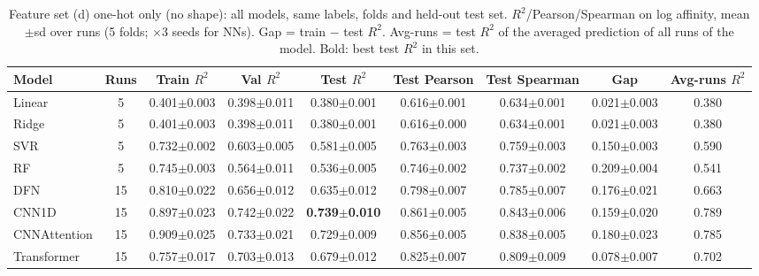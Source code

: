 \begin{table}[H]\centering\scriptsize\setlength{\tabcolsep}{3pt}
\caption{Feature set (d) one-hot only (no shape): all models, same labels, folds and held-out test set. $R^2$/Pearson/Spearman on log affinity, mean$\pm$sd over runs (5 folds; $\times$3 seeds for NNs). Gap = train $-$ test $R^2$. Avg-runs = test $R^2$ of the averaged prediction of all runs of the model. Bold: best test $R^2$ in this set.}
\begin{tabular}{lcccccccc}\toprule
Model & Runs & Train $R^2$ & Val $R^2$ & Test $R^2$ & Test Pearson & Test Spearman & Gap & Avg-runs $R^2$\\\midrule
Linear & 5 & 0.401$\pm$0.003 & 0.398$\pm$0.011 & 0.380$\pm$0.001 & 0.616$\pm$0.001 & 0.634$\pm$0.001 & 0.021$\pm$0.003 & 0.380 \\
Ridge & 5 & 0.401$\pm$0.003 & 0.398$\pm$0.011 & 0.380$\pm$0.001 & 0.616$\pm$0.000 & 0.634$\pm$0.001 & 0.021$\pm$0.003 & 0.380 \\
SVR & 5 & 0.732$\pm$0.002 & 0.603$\pm$0.005 & 0.581$\pm$0.005 & 0.763$\pm$0.003 & 0.759$\pm$0.003 & 0.150$\pm$0.003 & 0.590 \\
RF & 5 & 0.745$\pm$0.003 & 0.564$\pm$0.011 & 0.536$\pm$0.005 & 0.746$\pm$0.002 & 0.737$\pm$0.002 & 0.209$\pm$0.004 & 0.541 \\
DFN & 15 & 0.810$\pm$0.022 & 0.656$\pm$0.012 & 0.635$\pm$0.012 & 0.798$\pm$0.007 & 0.785$\pm$0.007 & 0.176$\pm$0.021 & 0.663 \\
CNN1D & 15 & 0.897$\pm$0.023 & 0.742$\pm$0.022 & \textbf{0.739$\pm$0.010} & 0.861$\pm$0.005 & 0.843$\pm$0.006 & 0.159$\pm$0.020 & 0.789 \\
CNNAttention & 15 & 0.909$\pm$0.025 & 0.733$\pm$0.021 & 0.729$\pm$0.009 & 0.856$\pm$0.005 & 0.838$\pm$0.005 & 0.180$\pm$0.023 & 0.785 \\
Transformer & 15 & 0.757$\pm$0.017 & 0.703$\pm$0.013 & 0.679$\pm$0.012 & 0.825$\pm$0.007 & 0.809$\pm$0.009 & 0.078$\pm$0.007 & 0.702 \\
\bottomrule\end{tabular}\label{tab:fs_onehot}\end{table}

